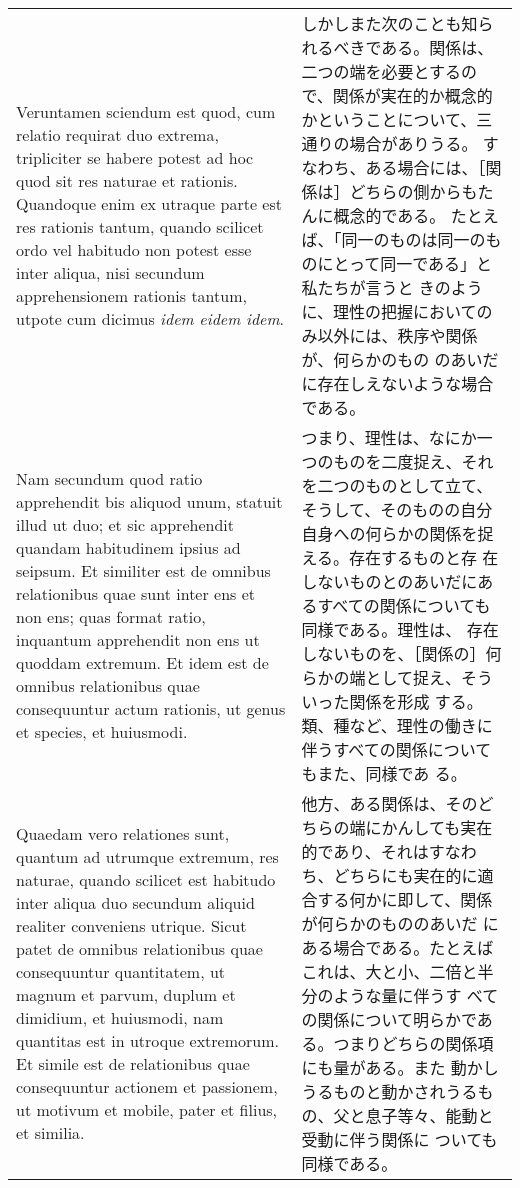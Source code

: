 \documentclass[10pt]{jsarticle}
\begin{document}
\begin{longtable}{p{21em}p{21em}}
\\

Veruntamen sciendum est quod, cum relatio requirat duo extrema,
tripliciter se habere potest ad hoc quod sit res naturae et
rationis. Quandoque enim ex utraque parte est res rationis tantum,
quando scilicet ordo vel habitudo non potest esse inter aliqua, nisi
secundum apprehensionem rationis tantum, utpote cum dicimus {\itshape
idem eidem idem}.

&

しかしまた次のことも知られるべきである。関係は、二つの端を必要とするの
で、関係が実在的か概念的かということについて、三通りの場合がありうる。
すなわち、ある場合には、［関係は］どちらの側からもたんに概念的である。
たとえば、「同一のものは同一のものにとって同一である」と私たちが言うと
きのように、理性の把握においてのみ以外には、秩序や関係が、何らかのもの
のあいだに存在しえないような場合である。

\\

Nam secundum quod ratio apprehendit bis aliquod unum, statuit illud ut
duo; et sic apprehendit quandam habitudinem ipsius ad seipsum. Et
similiter est de omnibus relationibus quae sunt inter ens et non ens;
quas format ratio, inquantum apprehendit non ens ut quoddam
extremum. Et idem est de omnibus relationibus quae consequuntur actum
rationis, ut genus et species, et huiusmodi.

&

つまり、理性は、なにか一つのものを二度捉え、それを二つのものとして立て、
そうして、そのものの自分自身への何らかの関係を捉える。存在するものと存
在しないものとのあいだにあるすべての関係についても同様である。理性は、
存在しないものを、［関係の］何らかの端として捉え、そういった関係を形成
する。類、種など、理性の働きに伴うすべての関係についてもまた、同様であ
る。

\\

Quaedam vero relationes sunt, quantum ad utrumque extremum, res
naturae, quando scilicet est habitudo inter aliqua duo secundum
aliquid realiter conveniens utrique. Sicut patet de omnibus
relationibus quae consequuntur quantitatem, ut magnum et parvum,
duplum et dimidium, et huiusmodi, nam quantitas est in utroque
extremorum. Et simile est de relationibus quae consequuntur actionem
et passionem, ut motivum et mobile, pater et filius, et similia.

&

他方、ある関係は、そのどちらの端にかんしても実在的であり、それはすなわ
ち、どちらにも実在的に適合する何かに即して、関係が何らかのもののあいだ
にある場合である。たとえばこれは、大と小、二倍と半分のような量に伴うす
べての関係について明らかである。つまりどちらの関係項にも量がある。また
動かしうるものと動かされうるもの、父と息子等々、能動と受動に伴う関係に
ついても同様である。


\end{longtable}
\end{document}

